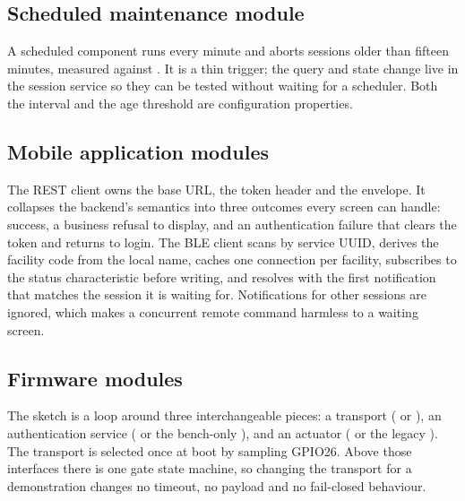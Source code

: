 \subsection{Scheduled maintenance module}

A scheduled component runs every minute and aborts  sessions older than
fifteen minutes, measured against . It is a thin trigger; the query
and state change live in the session service so they can be tested without waiting
for a scheduler. Both the interval and the age threshold are configuration
properties.

\subsection{Mobile application modules}

The REST client owns the base URL, the token header and the envelope. It collapses
the backend's semantics into three outcomes every screen can handle: success, a
business refusal to display, and an authentication failure that clears the token and
returns to login. The BLE client scans by service UUID, derives the facility code
from the local name, caches one connection per facility, subscribes to the status
characteristic before writing, and resolves with the first notification that matches
the session it is waiting for. Notifications for other sessions are ignored, which
makes a concurrent remote command harmless to a waiting screen.

\subsection{Firmware modules}

The sketch is a loop around three interchangeable pieces: a transport
( or ), an authentication
service ( or the bench-only
), and an actuator ( or the
legacy ). The transport is selected once at boot by sampling
GPIO26. Above those interfaces there is one gate state machine, so changing the
transport for a demonstration changes no timeout, no payload and no fail-closed
behaviour.


